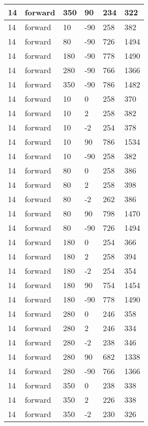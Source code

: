 \begin{longtable}{|l|l|l|l|l|l|}
			\hline
			14 & forward & 350 & 90 & 234 & 322 \\
			\hline
			14 & forward & 10 & -90 & 258 & 382 \\
			\hline
			14 & forward & 80 & -90 & 726 & 1494 \\
			\hline
			14 & forward & 180 & -90 & 778 & 1490 \\
			\hline
			14 & forward & 280 & -90 & 766 & 1366 \\
			\hline
			14 & forward & 350 & -90 & 786 & 1482 \\
			\hline
			14 & forward & 10 & 0 & 258 & 370 \\
			\hline
			14 & forward & 10 & 2 & 258 & 382 \\
			\hline
			14 & forward & 10 & -2 & 254 & 378 \\
			\hline
			14 & forward & 10 & 90 & 786 & 1534 \\
			\hline
			14 & forward & 10 & -90 & 258 & 382 \\
			\hline
			14 & forward & 80 & 0 & 258 & 386 \\
			\hline
			14 & forward & 80 & 2 & 258 & 398 \\
			\hline
			14 & forward & 80 & -2 & 262 & 386 \\
			\hline
			14 & forward & 80 & 90 & 798 & 1470 \\
			\hline
			14 & forward & 80 & -90 & 726 & 1494 \\
			\hline
			14 & forward & 180 & 0 & 254 & 366 \\
			\hline
			14 & forward & 180 & 2 & 258 & 394 \\
			\hline
			14 & forward & 180 & -2 & 254 & 354 \\
			\hline
			14 & forward & 180 & 90 & 754 & 1454 \\
			\hline
			14 & forward & 180 & -90 & 778 & 1490 \\
			\hline
			14 & forward & 280 & 0 & 246 & 358 \\
			\hline
			14 & forward & 280 & 2 & 246 & 334 \\
			\hline
			14 & forward & 280 & -2 & 238 & 346 \\
			\hline
			14 & forward & 280 & 90 & 682 & 1338 \\
			\hline
			14 & forward & 280 & -90 & 766 & 1366 \\
			\hline
			14 & forward & 350 & 0 & 238 & 338 \\
			\hline
			14 & forward & 350 & 2 & 226 & 338 \\
			\hline
			14 & forward & 350 & -2 & 230 & 326 \\

\end{longtable}
